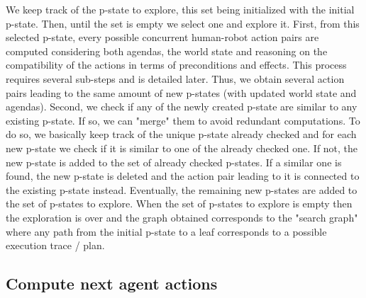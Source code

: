 We keep track of the p-state to explore, this set being initialized with the initial p-state. Then, until the set is empty we select one and explore it.
First, from this selected p-state, every possible concurrent human-robot action pairs are computed considering both agendas, the world state and reasoning on the compatibility of the actions in terms of preconditions and effects. This process requires several sub-steps and is detailed later. Thus, we obtain several action pairs leading to the same amount of new p-states (with updated world state and agendas).
Second, we check if any of the newly created p-state are similar to any existing p-state. If so, we can "merge" them to avoid redundant computations. To do so, we basically keep track of the unique p-state already checked and for each new p-state we check if it is similar to one of the already checked one. 
If not, the new p-state is added to the set of already checked p-states. 
If a similar one is found, the new p-state is deleted and the action pair leading to it is connected to the existing p-state instead.
Eventually, the remaining new p-states are added to the set of p-states to explore. 
When the set of p-states to explore is empty then the exploration is over and the graph obtained corresponds to the "search graph" where any path from the initial p-state to a leaf corresponds to a possible execution trace / plan.

    \subsection{Compute next agent actions}


